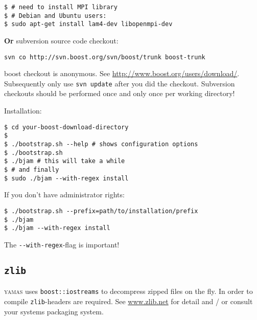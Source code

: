 \begin{lstlisting}[style=shell]
$ # need to install MPI library
$ # Debian and Ubuntu users:
$ sudo apt-get install lam4-dev libopenmpi-dev
\end{lstlisting}
\textbf{Or} subversion source code checkout:
\begin{lstlisting}[style=shell]
svn co http://svn.boost.org/svn/boost/trunk boost-trunk
\end{lstlisting}
\alert{boost checkout is anonymous. See \url{http://www.boost.org/users/download/}. Subsequently only use \texttt{svn update} after you did the checkout. Subversion checkouts should be performed once and only once per working directory!}

Installation:
\begin{lstlisting}[style=shell]
$ cd your-boost-download-directory
$
$ ./bootstrap.sh --help # shows configuration options
$ ./bootstrap.sh
$ ./bjam # this will take a while
$ # and finally
$ sudo ./bjam --with-regex install
\end{lstlisting}

If you don't have administrator rights:
\begin{lstlisting}[style=shell]
$ ./bootstrap.sh --prefix=path/to/installation/prefix
$ ./bjam
$ ./bjam --with-regex install
\end{lstlisting}

The \verb+--with-regex+-flag is important!


\subsection{\texttt{zlib}}
\textsc{yamas} uses \verb+boost::iostreams+ to decompress zipped files on the fly. In order to compile \verb+zlib+-headers are required. See \url{www.zlib.net} for detail and / or consult your systems packaging system.

